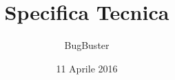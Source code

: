 



\title{\textbf{Specifica Tecnica}}
\author{BugBuster}

\date{11 Aprile 2016}




\makeFrontPage

\tableofcontents





